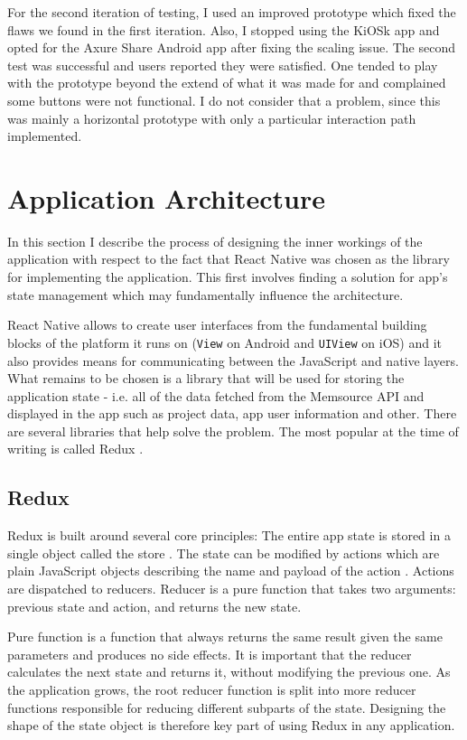 For the second iteration of testing, I used an improved prototype which fixed the flaws we found in the first iteration. Also, I stopped using the KiOSk app and opted for the Axure Share Android app after fixing the scaling issue. The second test was successful and users reported they were satisfied. One tended to play with the prototype beyond the extend of what it was made for and complained some buttons were not functional. I do not consider that a problem, since this was mainly a horizontal prototype with only a particular interaction path implemented.



\section{Application Architecture}

In this section I describe the process of designing the inner workings of the application with respect to the fact that React Native was chosen as the library for implementing the application. This first involves finding a solution for app's state management which may fundamentally influence the architecture.


React Native allows to create user interfaces from the fundamental building blocks of the platform it runs on (\texttt{View} on Android and \texttt{UIView} on iOS) and it also provides means for communicating between the JavaScript and native layers. What remains to be chosen is a library that will be used for storing the application state - i.e. all of the data fetched from the Memsource API and displayed in the app such as project data, app user information and other. There are several libraries that help solve the problem. The most popular at the time of writing is called Redux \cite{stateOfJS}.

\subsection{Redux}

Redux is built around several core principles:
The entire app state is stored in a single object called the store \cite{redux:store}. The state can be modified by actions which are plain JavaScript objects describing the name and payload of the action \cite{redux:store}. Actions are dispatched to reducers. Reducer is a pure function that takes two arguments: previous state and action, and returns the new state.

Pure function  is a function that always returns the same result given the same parameters and produces no side effects. It is important that the reducer calculates the next state and returns it, without modifying the previous one.
As the application grows, the root reducer function is split into more reducer functions responsible for reducing different subparts of the state. Designing the shape of the state object is therefore key part of using Redux in any application.

